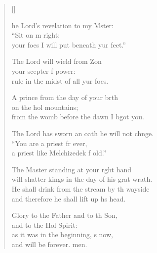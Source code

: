 \settowidth{\versewidth}{will shatter kings in the day of his great wrath.}
\begin{verse}[\versewidth]
  \begin{patverse}
he Lord’s revelation to my Mster:\Flex\\
“Sit on m right:\Med\\
your foes I will put beneath yur feet.”

The Lord will wield from Z\pointup{\i}on\Flex\\
your scepter f power:\Med\\
rule in the midst of all yur foes.

A prince from the day of your b\pointup{\i}rth\Flex\\
on the hol mountains;\Med\\
from the womb before the dawn I bgot you.

The Lord has sworn an oath he will not chnge.\Flex\\
“You are a priest fr ever,\Med\\
a priest like Melchizedek f old.”

The Master standing at your r\pointup{\i}ght hand\Med\\
will shatter kings in the day of his grat wrath.\\
He shall drink from the stream by th wayside\Med\\
and therefore he shall lift up h\pointup{\i}s head.

Glory to the Father and to th Son,\Med\\
and to the Hol Spirit:\\
as it was in the beginning, \pointup{\i}s now,\Med\\
and will be forever. men.
  \end{patverse}
\end{verse}
